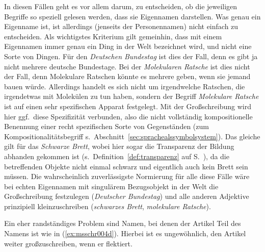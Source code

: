 \begin{exe}
  \ex\label{ex:msschr004} 
  \begin{xlist}
  \end{xlist}
\end{exe}

In diesen Fällen geht es vor allem darum, zu entscheiden, ob die jeweiligen Begriffe so speziell gelesen werden, dass sie Eigennamen darstellen.
Was genau ein Eigenname ist, ist allerdings (jenseits der Personennamen) nicht einfach zu entscheiden.
Als wichtigstes Kriterium gilt gemeinhin, dass mit einem Eigennamen immer genau ein Ding in der Welt bezeichnet wird, und nicht eine Sorte von Dingen.
Für den \textit{Deutschen Bundestag} ist dies der Fall, denn es gibt ja nicht mehrere deutsche Bundestage.
Bei der \textit{Molekularen Ratsche} ist dies nicht der Fall, denn Molekulare Ratschen könnte es mehrere geben, wenn sie jemand bauen würde.
Allerdings handelt es sich nicht um irgendwelche Ratschen, die irgendetwas mit Molekülen zu tun haben, sondern der Begriff \textit{Molekulare Ratsche} ist auf einen sehr spezifischen Apparat festgelegt.
Mit der Großschreibung wird hier ggf.\ diese Spezifizität verbunden, also die nicht vollständig kompositionelle Benennung einer recht spezifischen Sorte von Gegenständen (zum Kompositionalitätsbegriff s.\ Abschnitt~\ref{sec:sprachealssymbolsystem}).
Das gleiche gilt für das \textit{Schwarze Brett}, wobei hier sogar die Transparenz der Bildung abhanden gekommen ist (s.\ Definition~\ref{def:transparenz} auf S.~\pageref{def:transparenz}), da die betreffenden Objekte nicht einmal schwarz und eigentlich auch kein Brett sein müssen.
Die wahrscheinlich zuverlässigste Normierung für alle diese Fälle wäre bei echten Eigennamen mit singulärem Bezugsobjekt in der Welt die Großschreibung festzulegen (\textit{Deutscher Bundestag}) und alle anderen Adjektive prinzipiell kleinzuschreiben (\textit{schwarzes Brett}, \textit{molekulare Ratsche}).

Ein eher randständiges Problem sind Namen, bei denen der Artikel Teil des Namens ist wie in (\ref{ex:msschr004d}).
Hierbei ist es ungewöhnlich, den Artikel weiter großzuschreiben, wenn er flektiert.

\begin{exe}
  \ex\label{ex:msschr005} 
  \begin{xlist}
  \end{xlist}
\end{exe}

